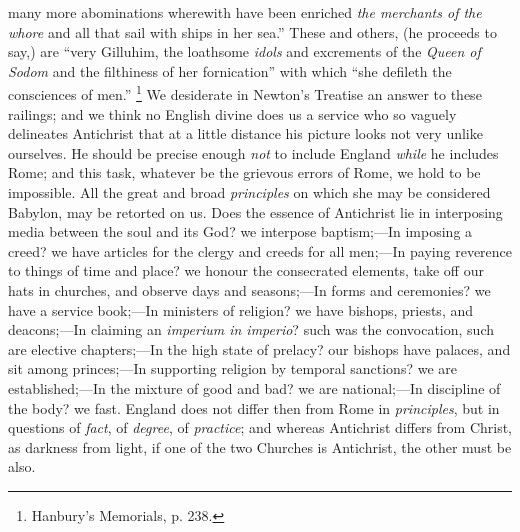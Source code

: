 many more abominations wherewith have been enriched \emph{the merchants
of the whore} and all that sail with ships in her sea.'' These
and others, (he proceeds to say,) are ``very Gilluhim, the
loathsome \emph{idols} and excrements of the \emph{Queen of Sodom} and
the filthiness of her fornication'' with which ``she defileth
the consciences of men.'' \footnote{Hanbury's
Memorials, p. 238.}
We desiderate in Newton's Treatise an answer to these railings; and we
think no English divine does us a service who so vaguely delineates
Antichrist that at a little distance his picture looks not very unlike
ourselves. He should be precise enough \emph{not} to include England \emph{while}
he includes Rome; and this task, whatever be the grievous errors of
Rome, we hold to be impossible. All the great and broad \emph{principles}
on which she may be considered Babylon, may be retorted on us. Does
the essence of Antichrist lie in interposing media between the soul
and its God? we interpose baptism;—In imposing a creed? we have
articles for the clergy and creeds for all men;—In paying reverence
to things of time and place? we honour the consecrated elements, take
off our hats in churches, and observe days and seasons;—In forms and
ceremonies? we have a service book;—In ministers of religion? we
have bishops, priests, and deacons;—In claiming an \emph{imperium in
imperio}? such was the convocation, such are elective chapters;—In
the high state of prelacy? our bishops have palaces, and sit
among princes;—In supporting religion by temporal sanctions? we are
established;—In the mixture of good and bad? we are national;—In
discipline of the body? we fast. England does not differ then from
Rome in \emph{principles}, but in questions of \emph{fact}, of \emph{degree},
of \emph{practice}; and whereas Antichrist differs from Christ, as
darkness from light, if one of the two Churches is Antichrist, the
other must be also.

